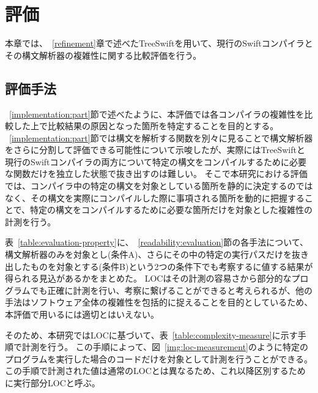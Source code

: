 \chapter{評価}
\label{evaluation}

本章では、~\ref{refinement}章で述べたTreeSwiftを用いて、現行のSwiftコンパイラとその構文解析器の複雑性に関する比較評価を行う。

\section{評価手法}
\label{evaluation:method}

~\ref{implementation:part}節で述べたように、本評価では各コンパイラの複雑性を比較した上で比較結果の原因となった箇所を特定することを目的とする。
~\ref{implementation:part}節では構文を解析する関数を別々に見ることで構文解析器をさらに分割して評価できる可能性について示唆したが、実際にはTreeSwiftと現行のSwiftコンパイラの両方について特定の構文をコンパイルするために必要な関数だけを独立した状態で抜き出すのは難しい。
そこで本研究における評価では、コンパイラ中の特定の構文を対象としている箇所を静的に決定するのではなく、その構文を実際にコンパイルした際に事項される箇所を動的に把握することで、特定の構文をコンパイルするために必要な箇所だけを対象とした複雑性の計測を行う。

表~\ref{table:evaluation-property}に、~\ref{readability:evaluation}節の各手法について、構文解析器のみを対象とし(条件A)、さらにその中の特定の実行パスだけを抜き出したものを対象とする(条件B)という2つの条件下でも考察するに値する結果が得られる見込があるかをまとめた。
LOCはその計測の容易さから部分的なプログラムでも正確に計測を行い、考察に繋げることができると考えられるが、他の手法はソフトウェア全体の複雑性を包括的に捉えることを目的としているため、本評価で用いるには適切とはいえない。

そのため、本研究ではLOCに基づいて、表~\ref{table:complexity-measure}に示す手順で計測を行う。
この手順によって、図~\ref{img:loc-measurement}のように特定のプログラムを実行した場合のコードだけを対象として計測を行うことができる。
この手順で計測された値は通常のLOCとは異なるため、これ以降区別するために実行部分LOCと呼ぶ。

